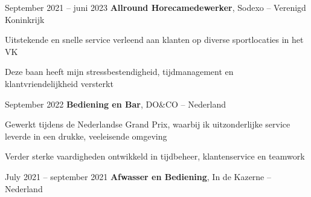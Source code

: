 	\vspace{0.10 cm}
	\begin{onecolentry}
		\begin{highlights}
			\item 
			\item 
			\item 
		\end{highlights}
	\end{onecolentry}
	
	\vspace{0.2 cm}
	
	\begin{twocolentry}{
			September 2021 – juni 2023
		}
		\textbf{Allround Horecamedewerker}, Sodexo -- Verenigd Koninkrijk
	\end{twocolentry}
	
	\vspace{0.10 cm}
	\begin{onecolentry}
		\begin{highlights}
			\item Uitstekende en snelle service verleend aan klanten op diverse sportlocaties in het VK
			\item Deze baan heeft mijn stressbestendigheid, tijdmanagement en klantvriendelijkheid versterkt
		\end{highlights}
	\end{onecolentry}
	
	\vspace{0.2 cm}
	
	\begin{twocolentry}{
			September 2022
		}
		\textbf{Bediening en Bar}, DO\&CO -- Nederland
	\end{twocolentry}
	
	\vspace{0.10 cm}
	\begin{onecolentry}
		\begin{highlights}
			\item Gewerkt tijdens de Nederlandse Grand Prix, waarbij ik uitzonderlijke service leverde in een drukke, veeleisende omgeving
			\item Verder sterke vaardigheden ontwikkeld in tijdbeheer, klantenservice en teamwork
		\end{highlights}
	\end{onecolentry}
	
	\vspace{0.2 cm}
	
	\begin{twocolentry}{
			July 2021 – september 2021
		}
		\textbf{Afwasser en Bediening}, In de Kazerne -- Nederland
	\end{twocolentry}
	

